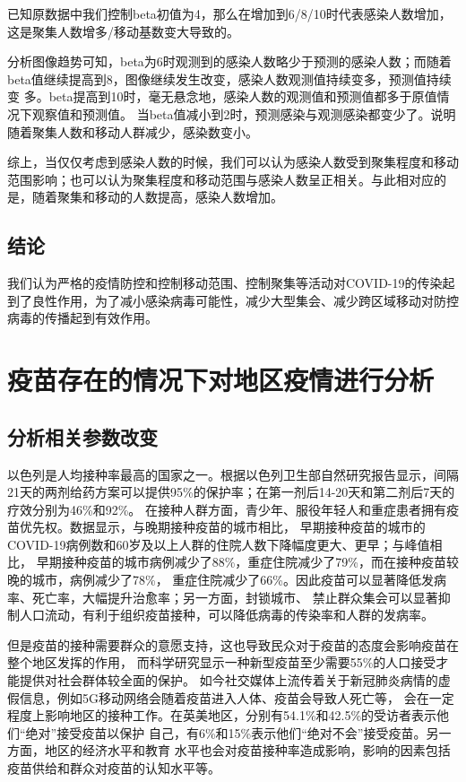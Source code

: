 \documentclass{cumcmthesis}
\begin{document}
已知原数据中我们控制beta初值为4，那么在增加到6/8/10时代表感染人数增加，这是聚集人数增多/移动基数变大导致的。

分析图像趋势可知，beta为6时观测到的感染人数略少于预测的感染人数；而随着beta值继续提高到8，图像继续发生改变，感染人数观测值持续变多，预测值持续变
多。beta提高到10时，毫无悬念地，感染人数的观测值和预测值都多于原值情况下观察值和预测值。
当beta值减小到2时，预测感染与观测感染都变少了。说明随着聚集人数和移动人群减少，感染数变小。

综上，当仅仅考虑到感染人数的时候，我们可以认为感染人数受到聚集程度和移动范围影响；也可以认为聚集程度和移动范围与感染人数呈正相关。与此相对应的是，随着聚集和移动的人数提⾼，感染人数增加。


\subsection{结论}
我们认为严格的疫情防控和控制移动范围、控制聚集等活动对COVID-19的传染起到了良性作用，为了减小感染病毒可能性，减少大型集会、减少跨区域移动对防控病毒的传播起到有效作用。

\clearpage
\section{疫苗存在的情况下对地区疫情进行分析}
\subsection{分析相关参数改变}
以色列是人均接种率最高的国家之一。根据以色列卫生部自然研究报告显示，间隔
21天的两剂给药方案可以提供95\%的保护率；在第一剂后14-20天和第二剂后7天的疗效分别为46\%和92\%。
在接种人群方面，青少年、服役年轻人和重症患者拥有疫苗优先权。数据显示，与晚期接种疫苗的城市相比，
早期接种疫苗的城市的COVID-19病例数和60岁及以上人群的住院人数下降幅度更大、更早；与峰值相比，
早期接种疫苗的城市病例减少了88\%，重症住院减少了79\%，而在接种疫苗较晚的城市，病例减少了78\%，
重症住院减少了66\%。因此疫苗可以显著降低发病率、死亡率，大幅提升治愈率；另一方面，封锁城市、
禁止群众集会可以显著抑制人口流动，有利于组织疫苗接种，可以降低病毒的传染率和人群的发病率。

但是疫苗的接种需要群众的意愿支持，这也导致民众对于疫苗的态度会影响疫苗在整个地区发挥的作用，
而科学研究显示一种新型疫苗至少需要55\%的人口接受才能提供对社会群体较全面的保护。
如今社交媒体上流传着关于新冠肺炎病情的虚假信息，例如5G移动网络会随着疫苗进入人体、疫苗会导致人死亡等，
会在一定程度上影响地区的接种⼯作。在英美地区，分别有54.1\%和42.5\%的受访者表示他们“绝对”接受疫苗以保护
自己，有6\%和15\%表示他们“绝对不会”接受疫苗。另一方面，地区的经济水平和教育
水平也会对疫苗接种率造成影响，影响的因素包括疫苗供给和群众对疫苗的认知水平等。
\end{document}
